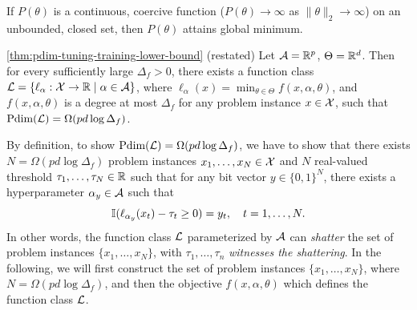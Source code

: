     \begin{lemma} \label{lm:evt-coercive}
        If $P(\theta)$ is a continuous, coercive function ($P(\theta) \rightarrow \infty$ as $\|\theta\|_2 \rightarrow \infty$) on an unbounded, closed set, then $P(\theta)$ attains global minimum. 
    \end{lemma}



\begin{customthm}{\ref{thm:pdim-tuning-training-lower-bound} (restated)}
    Let $\mathcal{A} = \mathbb{R}^p$, $\Theta = \mathbb{R}^d$. Then for every sufficiently large $\Delta_f > 0$, there exists a function class $\mathcal{L} = \{\ell_\alpha: \mathcal{X} \rightarrow \mathbb{R} \mid \alpha \in \mathcal{A}\}$, where $\ell_\alpha(x) = \min_{\theta \in \Theta} f(x, \alpha, \theta)$, and $f(x, \alpha, \theta)$ is a degree at most $\Delta_f$ for any problem instance $x \in \mathcal{X}$, such that $\text{\normalfont Pdim}(\mathcal{L}) = \Omega(pd\log \Delta_f)$.
\end{customthm}

    By definition, to show $\text{\normalfont Pdim}(\mathcal{L}) = \Omega(pd\log \Delta_f)$, we have to show that there exists $N = \Omega(pd\log \Delta_f)$ problem instances $x_1, \dots, x_N \in \mathcal{X}$ and $N$ real-valued threshold $\tau_1, \dots, \tau_N \in \mathbb{R}$ such that for any bit vector $y \in \{0, 1\}^{N}$, there exists a hyperparameter $\alpha_y \in \mathcal{A}$ such that
    \[
        \mathbb{I}(\ell_{\alpha_y}(x_t) - \tau_t \geq 0) = y_t, \quad t = 1, \dots, N.
    \]
        In other words, the function class $\mathcal{L}$ parameterized by $\mathcal{A}$ can \textit{shatter} the set of problem instances $\{x_1, \dots, x_N\}$, with $\tau_1, \dots, \tau_n$ \textit{witnesses the shattering}. In the following, we will first construct the set of problem instances $\{x_1, \dots, x_N\}$, where $N = \Omega(pd\log \Delta_f)$, and then the objective $f(x, \alpha, \theta)$ which defines the function class $\mathcal{L}$.

